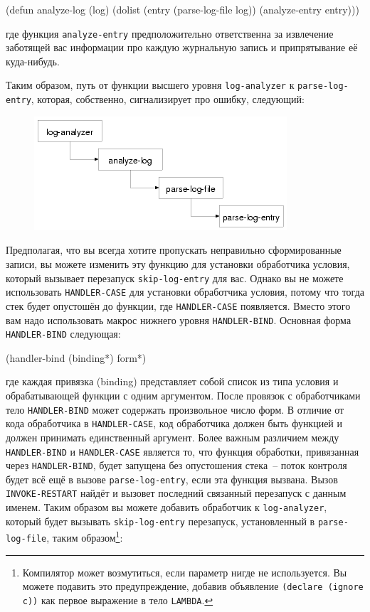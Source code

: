 \begin{myverb}
(defun analyze-log (log)
  (dolist (entry (parse-log-file log))
    (analyze-entry entry)))
\end{myverb}

\noindent{}где функция \lstinline{analyze-entry} предположительно ответственна за извлечение заботящей вас
информации про каждую журнальную запись и припрятывание её куда-нибудь.

Таким образом, путь от функции высшего уровня \lstinline{log-analyzer} к
\lstinline{parse-log-entry}, которая, собственно, сигнализирует про ошибку, следующий:

\begin{figure}[h]
  \centering
  \includegraphics[scale=0.6]{images/restart-call-stack.png}
\end{figure}

Предполагая, что вы всегда хотите пропускать неправильно сформированные записи, вы можете
изменить эту функцию для установки обработчика условия, который вызывает перезапуск
\lstinline{skip-log-entry} для вас. Однако вы не можете использовать \lstinline{HANDLER-CASE} для
установки обработчика условия, потому что тогда стек будет опустошён до функции, где
\lstinline{HANDLER-CASE} появляется. Вместо этого вам надо использовать макрос нижнего уровня
\lstinline{HANDLER-BIND}. Основная форма \lstinline{HANDLER-BIND} следующая:

\begin{myverb}
(handler-bind (binding*) form*)
\end{myverb}

\noindent{}где каждая привязка (binding) представляет собой список из типа условия и
обрабатывающей функции с одним аргументом. После провязок с обработчиками тело
\lstinline{HANDLER-BIND} может содержать произвольное число форм. В отличие от кода
обработчика в \lstinline{HANDLER-CASE}, код обработчика должен быть функцией и должен
принимать единственный аргумент. Более важным различием между \lstinline{HANDLER-BIND} и
\lstinline{HANDLER-CASE} является то, что функция обработки, привязанная через
\lstinline{HANDLER-BIND}, будет запущена без опустошения стека~-- поток контроля будет всё
ещё в вызове \lstinline{parse-log-entry}, если эта функция вызвана. Вызов
\lstinline{INVOKE-RESTART} найдёт и вызовет последний связанный перезапуск с данным
именем. Таким образом вы можете добавить обработчик к \lstinline{log-analyzer}, который
будет вызывать \lstinline{skip-log-entry} перезапуск, установленный в
\lstinline{parse-log-file}, таким образом\footnote{Компилятор может возмутиться, если
  параметр нигде не используется. Вы можете подавить это предупреждение, добавив
  объявление \lstinline{(declare (ignore c))} как первое выражение в тело
\lstinline{LAMBDA}.}:

